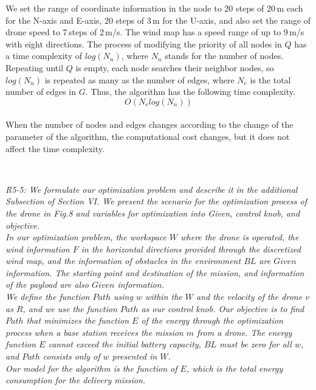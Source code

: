 \documentclass[onecolumn]{IEEEconf}
\begin{document}
\begin{description}
\begin{mdframed}[ linewidth=.75pt, userdefinedwidth=0.9\textwidth]
{    We set the range of coordinate information in the node to 20 steps of 20\,m each for the N-axis and E-axis, 20 steps of 3\,m for the U-axis, and also set the range of drone speed to 7\,steps of 2\,m/s. 
    The wind map has a speed range of up to 9\,m/s with eight directions.
    The process of modifying the priority of all nodes in $Q$ has a time complexity of $log(N_n)$, where $N_n$ stands for the number of nodes.
    Repeating until $Q$ is empty, each node searches their neighbor nodes, so $log(N_n)$ is repeated as many as the number of edges, where $N_e$ is the total number of edges in $G$. 
    Thus, the algorithm has the following time complexity.~\\
    \begin{equation*}
    O(N_elog(N_n)) \tag{6.3} \label{eq:complexity}
    \end{equation*}~\\
    When the number of nodes and edges changes according to the change of the parameter of the algorithm, the computational cost changes, but it does not affect the time complexity.
    }
    \end{mdframed} 
    ~\\
	\item \textit
	{
	R5-5: We formulate our optimization problem and describe it in the additional Subsection of Section VI. We present the scenario for the optimization process of the drone in Fig.8 and variables for optimization into Given, control knob, and objective.~\\
    In our optimization problem, the workspace $W$ where the drone is operated, the wind information $F$ in the horizontal directions provided through the discretized wind map, and the information of obstacles in the environment $BL$ are $Given$ information.
    The starting point and destination of the mission, and information of the payload are also $Given$ information.~\\
    We define the function $Path$ using $w$ within the $W$ and the velocity of the drone $v$ as $R$, and we use the function $Path$ as our control knob.
    Our objective is to find $Path$ that minimizes the function $E$ of the energy through the optimization process when a base station receives the mission $m$ from a drone.
    The energy function $E$ cannot exceed the initial battery capacity, $BL$ must be zero for all $w$, and $Path$ consists only of $w$ presented in $W$.~\\
    Our model for the algorithm is the function of $E$, which is the total energy consumption for the delivery mission.
}
\end{description}
\end{document}
